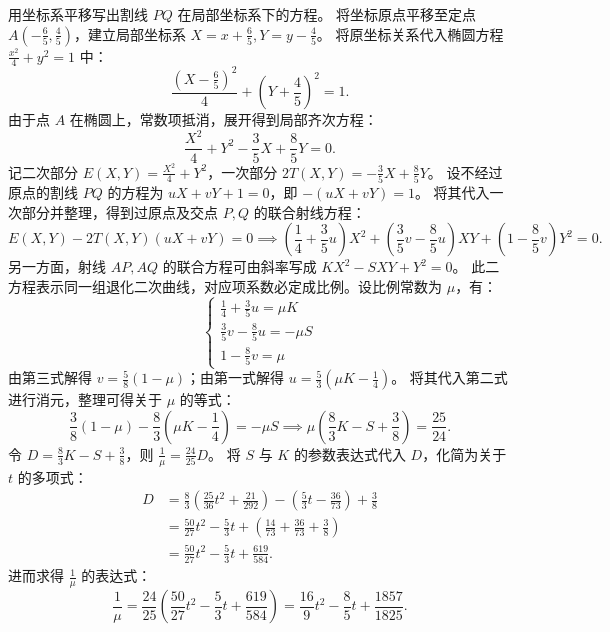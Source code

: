 \begin{solution}
用坐标系平移写出割线 $PQ$ 在局部坐标系下的方程。
将坐标原点平移至定点 $A\left(-\frac{6}{5}, \frac{4}{5}\right)$，建立局部坐标系 $X = x + \frac{6}{5}, Y = y - \frac{4}{5}$。
将原坐标关系代入椭圆方程 $\frac{x^2}{4} + y^2 = 1$ 中：
\[ \frac{\left(X - \frac{6}{5}\right)^2}{4} + \left(Y + \frac{4}{5}\right)^2 = 1. \]
由于点 $A$ 在椭圆上，常数项抵消，展开得到局部齐次方程：
\[ \frac{X^2}{4} + Y^2 - \frac{3}{5}X + \frac{8}{5}Y = 0. \]
记二次部分 $E(X,Y) = \frac{X^2}{4} + Y^2$，一次部分 $2T(X,Y) = -\frac{3}{5}X + \frac{8}{5}Y$。
设不经过原点的割线 $PQ$ 的方程为 $uX + vY + 1 = 0$，即 $-(uX + vY) = 1$。
将其代入一次部分并整理，得到过原点及交点 $P, Q$ 的联合射线方程：
\[ E(X,Y) - 2T(X,Y)(uX + vY) = 0 \implies \left(\frac{1}{4} + \frac{3}{5}u\right)X^2 + \left(\frac{3}{5}v - \frac{8}{5}u\right)XY + \left(1 - \frac{8}{5}v\right)Y^2 = 0. \]
另一方面，射线 $AP, AQ$ 的联合方程可由斜率写成 $K X^2 - S XY + Y^2 = 0$。
此二方程表示同一组退化二次曲线，对应项系数必定成比例。设比例常数为 $\mu$，有：
\[ \begin{cases} \frac{1}{4} + \frac{3}{5}u = \mu K \\ \frac{3}{5}v - \frac{8}{5}u = -\mu S \\ 1 - \frac{8}{5}v = \mu \end{cases} \]
由第三式解得 $v = \frac{5}{8}(1 - \mu)$；由第一式解得 $u = \frac{5}{3}\left(\mu K - \frac{1}{4}\right)$。
将其代入第二式进行消元，整理可得关于 $\mu$ 的等式：
\[ \frac{3}{8}(1 - \mu) - \frac{8}{3}\left(\mu K - \frac{1}{4}\right) = -\mu S \implies \mu\left(\frac{8}{3}K - S + \frac{3}{8}\right) = \frac{25}{24}. \]
令 $D = \frac{8}{3}K - S + \frac{3}{8}$，则 $\frac{1}{\mu} = \frac{24}{25}D$。
将 $S$ 与 $K$ 的参数表达式代入 $D$，化简为关于 $t$ 的多项式：
\begin{align*}
D &= \frac{8}{3}\left(\frac{25}{36}t^2 + \frac{21}{292}\right) - \left(\frac{5}{3}t - \frac{36}{73}\right) + \frac{3}{8} \\
&= \frac{50}{27}t^2 - \frac{5}{3}t + \left(\frac{14}{73} + \frac{36}{73} + \frac{3}{8}\right) \\
&= \frac{50}{27}t^2 - \frac{5}{3}t + \frac{619}{584}.
\end{align*}
进而求得 $\frac{1}{\mu}$ 的表达式：
\[ \frac{1}{\mu} = \frac{24}{25}\left(\frac{50}{27}t^2 - \frac{5}{3}t + \frac{619}{584}\right) = \frac{16}{9}t^2 - \frac{8}{5}t + \frac{1857}{1825}. \]


\end{solution}
